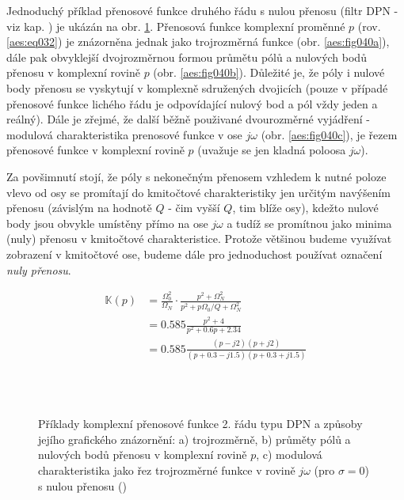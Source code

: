         Jednoduchý příklad přenosové funkce druhého řádu s nulou přenosu (filtr DPN - viz kap.
        ) je ukázán na obr. \ref{aes:fig040}. Přenosová funkce
        komplexní proměnné \(p\) (rov. \ref{aes:eq032}) je znázorněna jednak jako trojrozměrná
        funkce (obr. \ref{aes:fig040a}), dále pak obvyklejší dvojrozměrnou formou průmětu pólů a
        nulových bodů přenosu v komplexní rovině \(p\) (obr. \ref{aes:fig040b}). Důležité je, že
        póly i nulové body přenosu se vyskytují v komplexně sdružených dvojicích (pouze v případé
        přenosové funkce lichého řádu je odpovídající nulový bod a pól vždy jeden a reálný). Dále je
        zřejmé, že další běžně použivané dvourozměrné vyjádření - modulová charakteristika prenosové
        funkce v ose \(j\omega\) (obr. \ref{aes:fig040c}), je řezem přenosové funkce v komplexní
        rovině \(p\) (uvažuje se jen kladná poloosa \(j\omega\)).        
        
        Za povšimnutí stojí, že póly s nekonečným přenosem vzhledem k nutné poloze vlevo od osy se
        promítají do kmitočtové charakteristiky jen určitým navýšením přenosu (závislým na hodnotě
        \(Q\) - čim vyšší \(Q\), tim blíže osy), kdežto nulové body jsou obvykle umístěny přímo na
        ose \(j\omega\) a tudíž se promítnou jako minima (nuly) přenosu v kmitočtové
        charakteristice. Protože většinou budeme využívat zobrazení v kmitočtové ose, budeme dále
        pro jednoduchost používat označení \emph{nuly přenosu}. 

        \begin{align}\label{aes:eq035}
          \mathbb{K}(p) 
            &= \frac{\Omega_0^2}{\Omega_N}\cdot
               \frac{p^2 + \Omega_N^2}{p^2 + p\Omega_0/Q + \Omega_N^2}     \nonumber \\
            &=\num{0.585}\frac{p^2 + 4}{p^2 + \num{0.6}p + \num{2.34}}     \nonumber \\
            &=\num{0.585}\frac{(p-j2)(p+j2)}{(p+\num{0.3}-j\num{1.5})(p+\num{0.3}+j\num{1.5})}            
        \end{align}

        \begin{figure}[ht!]
          \centering  
                   \\
                   \\
          \caption{Příklady komplexní přenosové funkce 2. řádu typu DPN a způsoby jejího grafického
                  znázornění: a) trojrozměrně, b) průměty pólů a nulových bodů přenosu v komplexní
                  rovině \(p\), c) modulová charakteristika jako řez trojrozměrné funkce v rovině
                  \(j\omega\) (pro \(\sigma = 0\)) s nulou přenosu
                  (\cite[s.~40]{HajekSedlacek2002})}
          \label{aes:fig040}
        \end{figure}

